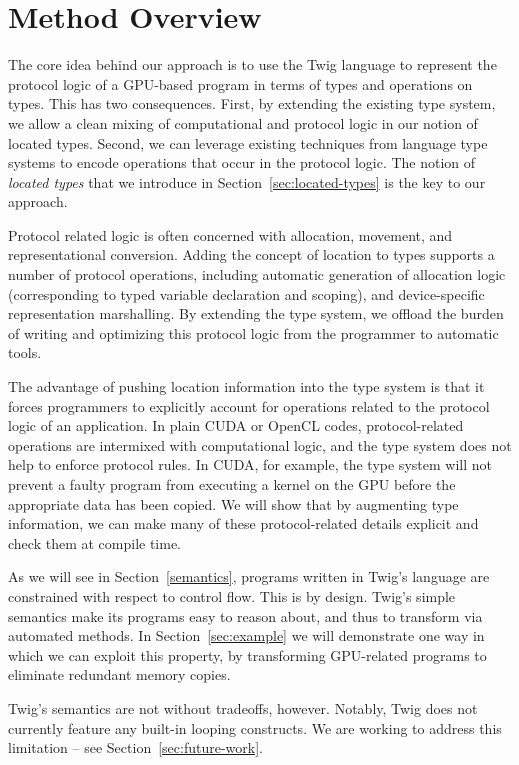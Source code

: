 
\section{Method Overview}

The core idea behind our approach is to use the Twig language to represent the protocol logic of a GPU-based program in terms of types and operations on types. This has two consequences. First, by extending the existing type system, we allow a clean mixing of computational and protocol logic in our notion of located types. Second, we can leverage existing techniques from language type systems to encode operations that occur in the protocol logic. The notion of \emph{located types} that we introduce in Section~\ref{sec:located-types} is the key to our approach.

Protocol related logic is often concerned with allocation, movement, and representational conversion. Adding the concept of location to types supports a number of protocol operations, including automatic generation of allocation logic (corresponding to typed variable declaration and scoping), and device-specific representation marshalling. By extending the type system, we offload the burden of writing and optimizing this protocol logic from the programmer to automatic tools.

The advantage of pushing location information into the type system is that it forces programmers to explicitly account for operations related to the protocol logic of an application. In plain CUDA or OpenCL codes, protocol-related operations are intermixed with computational logic, and the type system does not help to enforce protocol rules. In CUDA, for example, the type system will not prevent a faulty program from executing a kernel on the GPU before the appropriate data has been copied. We will show that by augmenting type information, we can make many of these protocol-related details explicit and check them at compile time.

As we will see in Section~\ref{semantics}, programs written in Twig's language are constrained with respect to control flow. This is by design. Twig's simple semantics make its programs easy to reason about, and thus to transform via automated methods. In Section~\ref{sec:example} we will demonstrate one way in which we can exploit this property, by transforming GPU-related programs to eliminate redundant memory copies.

Twig's semantics are not without tradeoffs, however. Notably, Twig does not currently feature any built-in looping constructs. We are working to address this limitation -- see Section~\ref{sec:future-work}.

